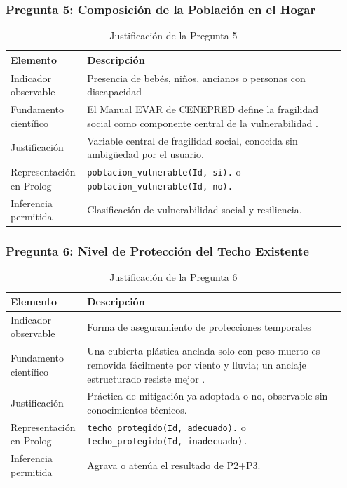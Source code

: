 \documentclass[12pt, letterpaper]{article}
\begin{document}
\subsubsection*{Pregunta 5: Composición de la Población en el Hogar}
\begin{table}[H]
\centering
\caption{Justificación de la Pregunta 5}
\label{tab:p5}
\begin{tabular}{@{}p{0.2\linewidth}p{0.75\linewidth}@{}}
\toprule
\textbf{Elemento} & \textbf{Descripción} \\ \midrule
Indicador observable & Presencia de bebés, niños, ancianos o personas con discapacidad \\
Fundamento científico & El Manual EVAR de CENEPRED define la fragilidad social como componente central de la vulnerabilidad \parencite{cenepred_manual_evar}. \\
Justificación & Variable central de fragilidad social, conocida sin ambigüedad por el usuario. \\
Representación en Prolog & \texttt{poblacion\_vulnerable(Id, si).} o \texttt{poblacion\_vulnerable(Id, no).} \\
Inferencia permitida & Clasificación de vulnerabilidad social y resiliencia. \\ \bottomrule
\end{tabular}
\end{table}

\subsubsection*{Pregunta 6: Nivel de Protección del Techo Existente}
\begin{table}[H]
\centering
\caption{Justificación de la Pregunta 6}
\label{tab:p6}
\begin{tabular}{@{}p{0.2\linewidth}p{0.75\linewidth}@{}}
\toprule
\textbf{Elemento} & \textbf{Descripción} \\ \midrule
Indicador observable & Forma de aseguramiento de protecciones temporales \\
Fundamento científico & Una cubierta plástica anclada solo con peso muerto es removida fácilmente por viento y lluvia; un anclaje estructurado resiste mejor \parencite{typsa_drenaje}. \\
Justificación & Práctica de mitigación ya adoptada o no, observable sin conocimientos técnicos. \\
Representación en Prolog & \texttt{techo\_protegido(Id, adecuado).} o \texttt{techo\_protegido(Id, inadecuado).} \\
Inferencia permitida & Agrava o atenúa el resultado de P2+P3. \\ \bottomrule
\end{tabular}
\end{table}
\end{document}
